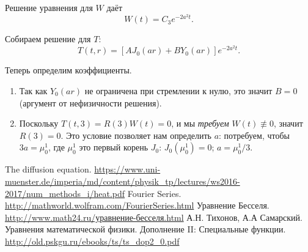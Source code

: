 \documentclass[12pt]{report}
\begin{document}
Решение уравнения для $W$ даёт
\[
W(t) = C_3e^{-2a^2t}.
\]

Собираем решение для $T$:
\[
T(t,r) = \left[AJ_0(ar) + BY_0(ar)\right]e^{-2a^2t}.
\]

Теперь определим коэффициенты.
\begin{enumerate}
	\item Так как $Y_0(ar)$ не ограничена при стремлении к нулю, это значит $B=0$ (аргумент от нефизичности решения).
	\item Поскольку $T(t,3) = R(3)W(t) = 0$, и мы \emph{требуем} $W(t) \not\equiv 0$,
	значит $R(3) = 0$. Это условие позволяет нам определить $a$: потребуем, чтобы $3a = \mu^1_0$, где $\mu^1_0$ это первый корень $J_0$: $J_0(\mu^1_0) = 0$; $a = \mu^1_0/3$. 
\end{enumerate}
 

\begin{thebibliography}{0}
	The diffusion equation.
	\url{https://www.uni-muenster.de/imperia/md/content/physik_tp/lectures/ws2016-2017/num_methods_i/heat.pdf}
	Fourier Series.
	\url{http://mathworld.wolfram.com/FourierSeries.html}
	Уравнение Бесселя.
	\url{http://www.math24.ru/уравнение-бесселя.html}
	А.Н. Тихонов, А.А Самарский. Уравнения математической физики.
	Дополнение II: Специальные функции.
	\url{http://old.pskgu.ru/ebooks/ts/ts_dop2_0.pdf}
\end{thebibliography}
      
\end{document}
